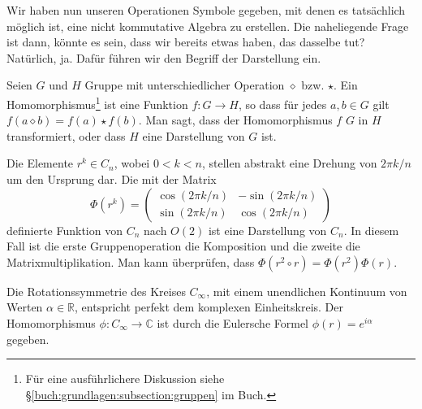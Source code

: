 Wir haben nun unseren Operationen Symbole gegeben, mit denen es tatsächlich
möglich ist, eine nicht kommutative Algebra zu erstellen. Die naheliegende
Frage ist dann, könnte es sein, dass wir bereits etwas haben, das dasselbe tut?
Natürlich, ja. Dafür führen wir den Begriff der Darstellung ein.
\begin{definition}
	Seien \(G\) und \(H\) Gruppe mit unterschiedlicher Operation \(\diamond\)
	bzw.  \(\star\). Ein Homomorphismus\footnote{ Für eine ausführlichere
	Diskussion siehe \S\ref{buch:grundlagen:subsection:gruppen} im Buch.} ist
	eine Funktion \(f: G \to H\), so dass für jedes \(a, b \in G\) gilt
	\(f(a\diamond b) = f(a) \star f(b)\).  Man sagt, dass der Homomorphismus
	\(f\) \(G\) in \(H\) transformiert, oder dass \(H\) eine Darstellung von
	\(G\) ist.
\end{definition}
\begin{beispiel}
	Die Elemente \(r^k \in C_n\), wobei \(0 < k < n\), stellen abstrakt eine
	Drehung von \(2\pi k/n\) um den Ursprung dar. Die mit der Matrix 
	\[
		\Phi(r^k) = \begin{pmatrix}
			\cos(2\pi k/n) & -\sin(2\pi k/n) \\
			\sin(2\pi k/n) &  \cos(2\pi k/n)
		\end{pmatrix}
	\]
	definierte Funktion von \(C_n\) nach \(O(2)\) ist eine Darstellung von
	\(C_n\). In diesem Fall ist die erste Gruppenoperation die Komposition und
	die zweite die Matrixmultiplikation. Man kann überprüfen, dass \(\Phi(r^2
	\circ r) = \Phi(r^2)\Phi(r)\).
\end{beispiel}
\begin{beispiel}
	Die Rotationssymmetrie des Kreises \(C_\infty\), mit einem unendlichen
	Kontinuum von Werten \(\alpha \in \mathbb{R}\), entspricht perfekt dem
	komplexen Einheitskreis. Der Homomorphismus \(\phi: C_\infty \to \mathbb{C}\)
	ist durch die Eulersche Formel \(\phi(r) = e^{i\alpha}\) gegeben.
\end{beispiel}

